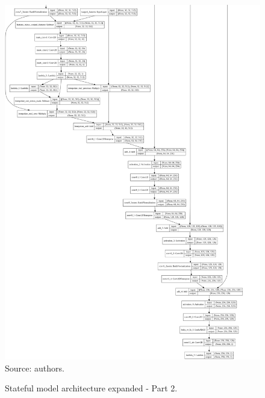 \documentclass[12pt,openright,oneside,a4paper,english, brazilian]{abntex2}
\begin{document}
\begin{otherlanguage}{english}
\begin{figure}[!htb]
\centering
\caption{Stateful model architecture expanded - Part 2.}
\includegraphics[height = \textheight]{model_plot/Stateful2}
Source: authors.
\label{stateful_plot_2}
\end{figure}

\end{otherlanguage}
\end{document}

